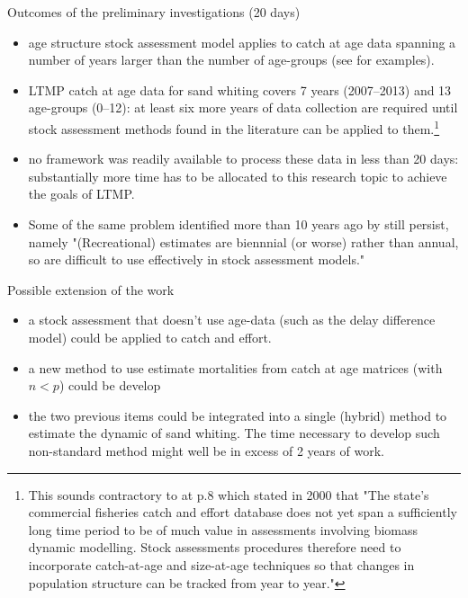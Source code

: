 Outcomes of the preliminary investigations (20 days)

\begin{itemize}
\item age structure stock assessment model applies to catch at age data spanning a number of years larger than the number of age-groups (see \cite{CASAL12m, mill99m, Four82a} for examples).
\item LTMP catch at age data for sand whiting covers 7 years (2007--2013) and 13 age-groups (0--12): at least six more years of data collection are required until stock assessment methods found in the literature can be applied to them.\footnote{This sounds contractory to \cite{HoyR2000} at p.8 which stated in 2000 that "The state's commercial fisheries catch and effort database does not yet span a sufficiently long time period to be of much value in assessments involving biomass dynamic modelling. Stock assessments procedures therefore need to incorporate catch-at-age and size-at-age techniques so that changes in population structure can be tracked from year to year."}
\item no framework was readily available to process these data in less than 20 days: substantially more time has to be allocated to this research topic to achieve the goals of LTMP.
\item Some of the same problem identified more than 10 years ago by \cite{HoyR2000} still persist, namely "(Recreational) estimates are biennnial (or worse) rather than annual, so are difficult to use effectively in stock assessment models."
\end{itemize}

\noindent Possible extension of the work

\begin{itemize}
\item a stock assessment that doesn't use age-data (such as the delay difference model) could be applied to catch and effort. 
\item a new method to use estimate mortalities from catch at age matrices (with $n<p$) could be develop
\item the two previous items could be integrated into a single (hybrid) method to estimate the dynamic of sand whiting. The time necessary to develop such non-standard method might well be in excess of 2 years of work.
\end{itemize}
